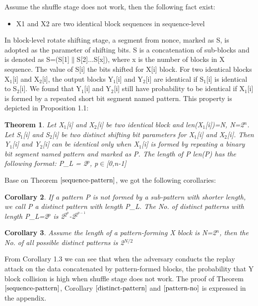 \documentclass{article}
\newtheorem{theorem}{Theorem}[section]
\newtheorem{corollary}[theorem]{Corollary}
\begin{document}
Assume the shuffle stage does not work, then the following fact exist:
\begin{itemize}
	\item X1 and X2 are two identical block sequences in sequence-level
\end{itemize}

In block-level rotate shifting stage, a segment from nonce, marked as S, is adopted as the parameter of shifting bits. S is a concatenation of sub-blocks and is denoted as S=(S[1]$\|$S[2]$\ldots$S[x]), where x is the number of blocks in X sequence. The value of S[i] the bits shifted for X[i] block.
For two identical blocks X$_1$[i] and X$_2$[i], the output blocks Y$_1$[i] and Y$_2$[i] are identical if S$_1$[i] is identical to S$_2$[i]. We found that Y$_1$[i] and Y$_2$[i] still have probability to be identical if X$_1$[i] is formed by a repeated short bit segment named pattern. This property is depicted in Proposition 1.1:
\begin{theorem}
Let X$_1$[i] and X$_2$[i] be two identical block and len(X$_1$[i])=N, N=2$^n$. Let S$_1$[i] and S$_2$[i] be two distinct shifting bit parameters for X$_1$[i] and X$_2$[i].
Then Y$_1$[i] and Y$_2$[i] can be identical only when X$_1$[i] is formed by repeating a binary bit segment named pattern and marked as P. The length of P len(P) has the following format:
	P\_L = 2$^p$, p$\in$[0,n-1]
\label{sequence-pattern}
\end{theorem}
Base on Theorem $\ref{sequence-pattern}$, we got the following corollaries:
\begin{corollary}
If a pattern P is not formed by a sub-pattern with shorter length, we call P a distinct pattern with length P\_L. The No. of distinct patterns with length P\_L=2$^p$ is 2$^{2^p}$-2$^{2^{p-1}}$
\label{distinct-pattern}
\end{corollary}
\begin{corollary}
Assume the length of a pattern-forming X block is N=2$^n$, then the No. of all possible distinct patterns is 2$^{N/2}$
\label{pattern-no}
\end{corollary}

From Corollary 1.3 we can see that when the adversary conducts the replay attack on the data concatenated by pattern-formed blocks, the probability that Y block collision is high when shuffle stage does not work. The proof of Theorem $\ref{sequence-pattern}$, Corollary $\ref{distinct-pattern}$ and $\ref{pattern-no}$ is expressed in the appendix. 
\end{document}
